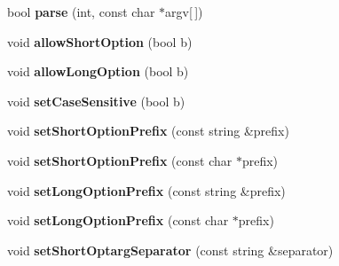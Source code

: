 \begin{DoxyCompactItemize}
\item 
\hypertarget{classpfs_1_1cli_1_1cli_acfbe325b0a6a43519bb12cd56f6a9847}{bool {\bfseries parse} (int, const char $\ast$argv\mbox{[}$\,$\mbox{]})}\label{classpfs_1_1cli_1_1cli_acfbe325b0a6a43519bb12cd56f6a9847}

\item 
\hypertarget{classpfs_1_1cli_1_1cli_a8c560190e01d99ba40a4b108ab2bce74}{void {\bfseries allow\-Short\-Option} (bool b)}\label{classpfs_1_1cli_1_1cli_a8c560190e01d99ba40a4b108ab2bce74}

\item 
\hypertarget{classpfs_1_1cli_1_1cli_a486d829aae141fa91ec512358bc955eb}{void {\bfseries allow\-Long\-Option} (bool b)}\label{classpfs_1_1cli_1_1cli_a486d829aae141fa91ec512358bc955eb}

\item 
\hypertarget{classpfs_1_1cli_1_1cli_a28486ff671735141f33fd52234353db4}{void {\bfseries set\-Case\-Sensitive} (bool b)}\label{classpfs_1_1cli_1_1cli_a28486ff671735141f33fd52234353db4}

\item 
\hypertarget{classpfs_1_1cli_1_1cli_aeebd6437ba96567a54e5b837a051d8ac}{void {\bfseries set\-Short\-Option\-Prefix} (const string \&prefix)}\label{classpfs_1_1cli_1_1cli_aeebd6437ba96567a54e5b837a051d8ac}

\item 
\hypertarget{classpfs_1_1cli_1_1cli_ad6f61711b6057cf004820f4df40139e5}{void {\bfseries set\-Short\-Option\-Prefix} (const char $\ast$prefix)}\label{classpfs_1_1cli_1_1cli_ad6f61711b6057cf004820f4df40139e5}

\item 
\hypertarget{classpfs_1_1cli_1_1cli_a405f7fa7fda744d38d99663745f642dc}{void {\bfseries set\-Long\-Option\-Prefix} (const string \&prefix)}\label{classpfs_1_1cli_1_1cli_a405f7fa7fda744d38d99663745f642dc}

\item 
\hypertarget{classpfs_1_1cli_1_1cli_adb553b6ea9671ef080425e371cfd4fb8}{void {\bfseries set\-Long\-Option\-Prefix} (const char $\ast$prefix)}\label{classpfs_1_1cli_1_1cli_adb553b6ea9671ef080425e371cfd4fb8}

\item 
\hypertarget{classpfs_1_1cli_1_1cli_a85ac492dfb93dad59817c0db72cb9c25}{void {\bfseries set\-Short\-Optarg\-Separator} (const string \&separator)}\label{classpfs_1_1cli_1_1cli_a85ac492dfb93dad59817c0db72cb9c25}


\end{DoxyCompactItemize}

